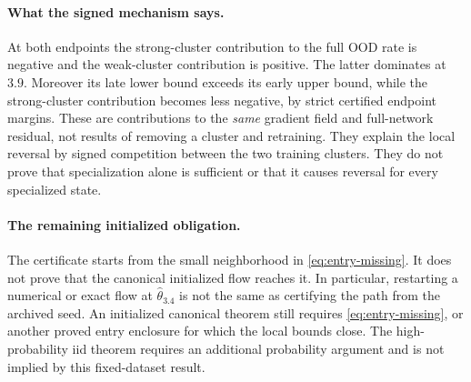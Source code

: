 \paragraph{What the signed mechanism says.}
At both endpoints the strong-cluster contribution to the full OOD rate is
negative and the weak-cluster contribution is positive. The latter dominates
at $3.9$. Moreover its late lower bound exceeds its early upper bound, while
the strong-cluster contribution becomes less negative, by strict certified
endpoint margins. These are contributions to the \emph{same} gradient field
and full-network residual, not results of removing a cluster and retraining.
They explain the local reversal by signed competition between the two
training clusters. They do not prove that specialization alone is sufficient
or that it causes reversal for every specialized state.

\paragraph{The remaining initialized obligation.}
The certificate starts from the small neighborhood in
\eqref{eq:entry-missing}. It does not prove that the canonical initialized
flow reaches it. In particular, restarting a numerical or exact flow at
$\widehat\theta_{3.4}$ is not the same as certifying the path from the
archived seed. An initialized canonical theorem still requires
\eqref{eq:entry-missing}, or another proved entry enclosure for which the
local bounds close. The high-probability iid theorem requires an additional
probability argument and is not implied by this fixed-dataset result.
